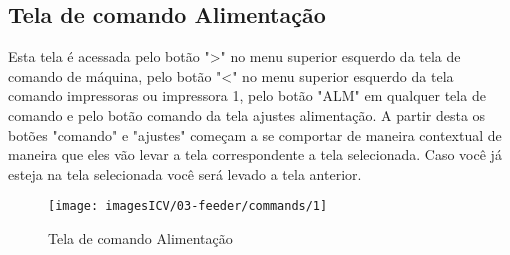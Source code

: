 \usepackage{graphicx}\newpage
\thispagestyle{fancy}
\vspace{\fill}
\subsection{Tela de comando Alimentação}
Esta tela é acessada pelo botão "\textgreater" no menu superior esquerdo da tela de comando de máquina, pelo botão "\textless{}" no menu superior esquerdo da tela comando impressoras ou impressora 1, pelo botão "ALM" em qualquer tela de comando e pelo botão comando da tela ajustes alimentação. A partir desta os botões "comando" e "ajustes" começam a se comportar de maneira contextual de maneira que eles vão levar a tela correspondente a tela selecionada. Caso você já esteja na tela selecionada você será levado a tela anterior.

\begin{figure}
    \centering
    \texttt{[image: imagesICV/03-feeder/commands/1]}
    \caption{Tela de comando Alimentação}
    \label{fig:}
\end{figure}